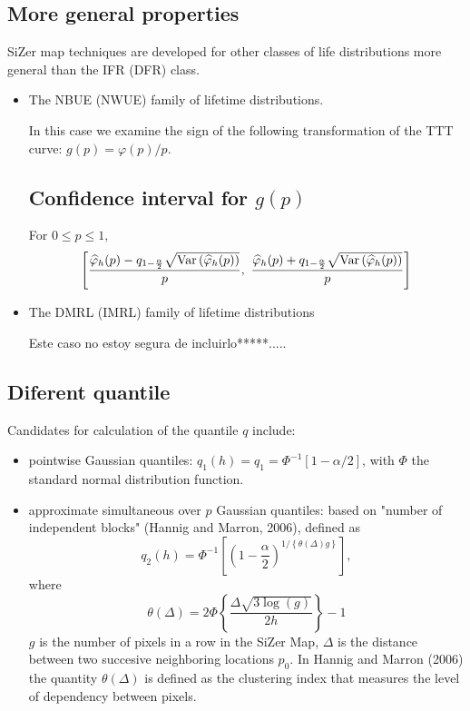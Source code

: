 \documentclass[preprint,12pt]{elsarticle}
\begin{document}
\subsection*{More general properties}
\noindent SiZer map techniques are developed for other classes of life distributions more general than the IFR (DFR) class.
\begin{itemize}
\item The NBUE (NWUE) family of lifetime distributions.

\noindent In this case we examine the sign of the following transformation of the  TTT curve: $g(p)=\varphi(p)/p$.
\subsection*{Confidence interval for $g(p)$}
\noindent For $0\leq p \leq 1$,
\[
\left[\frac{\widehat{\varphi}_h(p)-q_{1-\frac{\alpha}{2}}\sqrt{{\rm Var}\left(\widehat{\varphi}_h(p)\right)}}{p}, \ \frac{\widehat{\varphi}_h(p)+q_{1-\frac{\alpha}{2}}\sqrt{{\rm Var}\left(\widehat{\varphi}_h(p)\right)}}{p}\right]
\]

\bigskip

\item The DMRL (IMRL) family of lifetime distributions

\noindent Este caso no estoy segura de incluirlo*****.....
\end{itemize}

\subsection{Diferent quantile}
\noindent Candidates for calculation of the quantile $q$ include:
\begin{itemize}
	\item pointwise Gaussian quantiles: $q_1(h) = q_1 = \Phi^{-1}[1-\alpha/2]$, with $\Phi$ the standard normal distribution function. 
	\item approximate simultaneous over $p$ Gaussian quantiles: based on "number of independent blocks" (Hannig and Marron, 2006), defined as
	$$
	q_2(h) = \Phi^{-1} \left[\left(1- \frac{\alpha}{2}\right)^{1/\left\{\theta(\Delta)g\right\}}\right],
	$$
	where
	$$
	\theta(\Delta) =2 \Phi \left\{ \frac{\Delta \sqrt{3 \log(g)}}{2h}\right\}-1
	$$
	$g$ is the number of pixels in a row in the SiZer Map, $\Delta$ is the distance between two succesive neighboring locations $p_0$.
	In Hannig and Marron (2006) the quantity $\theta(\Delta)$ is defined as the clustering index that measures the level of dependency between pixels. 
\end{itemize}
\end{document}

